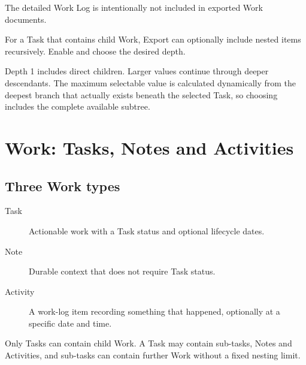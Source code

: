 \documentclass{testudomanual}
\begin{document}
The detailed Work Log is intentionally not included in exported Work documents.

For a Task that contains child Work, Export can optionally include nested items recursively. Enable  and choose the desired depth.

Depth 1 includes direct children. Larger values continue through deeper descendants. The maximum selectable value is calculated dynamically from the deepest branch that actually exists beneath the selected Task, so choosing  includes the complete available subtree.



\chapter{Work: Tasks, Notes and Activities}

\section{Three Work types}

\begin{description}
    \item[Task] Actionable work with a Task status and optional lifecycle dates.
    \item[Note] Durable context that does not require Task status.
    \item[Activity] A work-log item recording something that happened, optionally at a specific date and time.
\end{description}

Only Tasks can contain child Work. A Task may contain sub-tasks, Notes and Activities, and sub-tasks can contain further Work without a fixed nesting limit.
\end{document}
